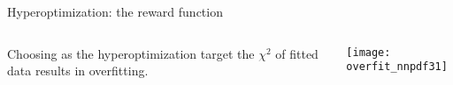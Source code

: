 \begin{frame}[t]{Hyperoptimization: the reward function}
    \begin{columns}[T]
        \begin{column}{0.48\textwidth}
            \vspace{\topsep}
            Choosing as the hyperoptimization target the $\chi^2$ of fitted data results in overfitting.
        \end{column}
        \begin{column}{0.48\textwidth}
            \texttt{[image: overfit\_nnpdf31]}
        \end{column}
    \end{columns}
\end{frame}



